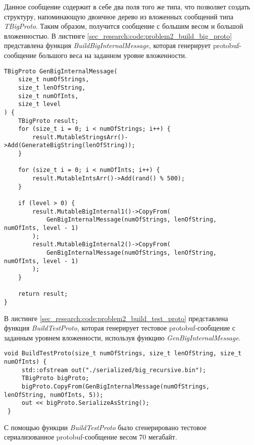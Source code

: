 Данное сообщение содержит в себе два поля того же типа, что позволяет создать структуру, напоминающую двоичное дерево из вложенных сообщений типа \textit{TBigProto}.
Таким образом, получится сообщение с большим весом и большой вложенностью.
В листинге \ref{sec_research:code:problem2_build_big_proto} представлена функция \textit{BuildBigInternalMessage}, которая генерирует protobuf-сообщение большого веса на заданном уровне вложенности.

\begin{lstlisting}[style=CodeListing, captionpos=b, caption={Функция BuildBigInternalMessage}, label=sec_research:code:problem2_build_big_proto]
TBigProto GenBigInternalMessage(
    size_t numOfStrings,
    size_t lenOfString,
    size_t numOfInts,
    size_t level
) {
    TBigProto result;
    for (size_t i = 0; i < numOfStrings; i++) {
        result.MutableStringsArr()->Add(GenerateBigString(lenOfString));
    }

    for (size_t i = 0; i < numOfInts; i++) {
        result.MutableIntsArr()->Add(rand() % 500);
    }

    if (level > 0) {
        result.MutableBigInternal1()->CopyFrom(
            GenBigInternalMessage(numOfStrings, lenOfString, numOfInts, level - 1)
        );
        result.MutableBigInternal2()->CopyFrom(
            GenBigInternalMessage(numOfStrings, lenOfString, numOfInts, level - 1)
        );
    }

    return result;
}
\end{lstlisting}

В листинге \ref{sec_research:code:problem2_build_test_proto} представлена функция \textit{BuildTestProto}, которая генерирует тестовое protobuf-сообщение с заданным уровнем вложенности, используя функцию \textit{GenBigInternalMessage}.

\begin{lstlisting}[style=CodeListing, captionpos=b, caption={Функция BuildTestProto}, label=sec_research:code:problem2_build_test_proto]
 void BuildTestProto(size_t numOfStrings, size_t lenOfString, size_t numOfInts) {
     std::ofstream out("./serialized/big_recursive.bin");
     TBigProto bigProto;
     bigProto.CopyFrom(GenBigInternalMessage(numOfStrings, lenOfString, numOfInts, 5));
     out << bigProto.SerializeAsString();
 }
\end{lstlisting}

С помощью функции \textit{BuildTestProto} было сгенерировано тестовое сериализованное protobuf-сообщение весом 70 мегабайт.

